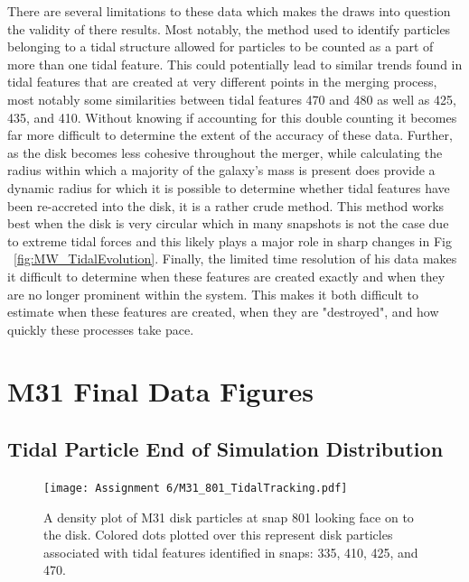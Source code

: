 \documentclass[fleqn,usenatbib]{mnras}
\begin{document}
There are several limitations to these data which makes the draws into question the validity of there results. Most notably, the method used to identify particles belonging to a tidal structure allowed for particles to be counted as a part of more than one tidal feature. This could potentially lead to similar trends found in tidal features that are created at very different points in the merging process, most notably some similarities between tidal features 470 and 480 as well as 425, 435, and 410. Without knowing if accounting for this double counting it becomes far more difficult to determine the extent of the accuracy of these data. Further, as the disk becomes less cohesive throughout the merger, while calculating the radius within which a majority of the galaxy's mass is present does provide a dynamic radius for which it is possible to determine whether tidal features have been re-accreted into the disk, it is a rather crude method. This method works best when the disk is very circular which in many snapshots is not the case due to extreme tidal forces and this likely plays a major role in sharp changes in Fig ~\ref{fig:MW_TidalEvolution}. Finally, the limited time resolution of his data makes it difficult to determine when these features are created exactly and when they are no longer prominent within the system. This makes it both difficult to estimate when these features are created, when they are "destroyed", and how quickly these processes take pace.



 


\appendix
\section{M31 Final Data Figures}
\subsection{Tidal Particle End of Simulation Distribution}
\begin{figure}
	\texttt{[image: Assignment 6/M31\_801\_TidalTracking.pdf]}
    \caption{A density plot of M31 disk particles at snap 801 looking face on to the disk. Colored dots plotted over this represent disk particles associated with tidal features identified in snaps: 335, 410, 425, and 470.}
    \label{fig:M31_EndSim}
\end{figure}
\end{document}
